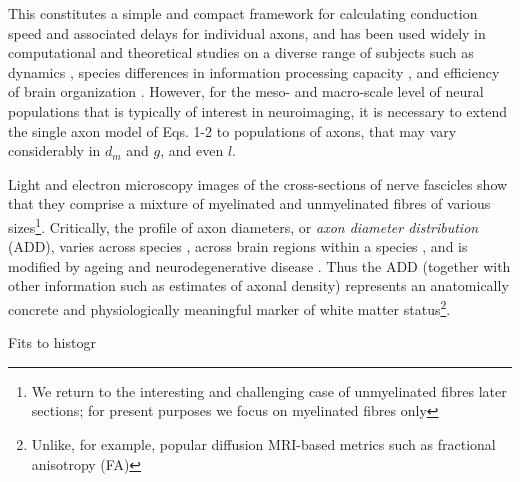 

This constitutes a simple and compact framework for calculating conduction speed and associated delays for individual axons, and has been used widely in computational and theoretical studies on a diverse range of subjects such as dynamics \cite{bojak2010axonal}, species differences in information processing capacity \cite{caminiti2009evolution}, and efficiency of brain organization \cite{chomiak2009what}. However, for the meso- and macro-scale level of neural populations that is typically of interest in neuroimaging, it is necessary to extend the single axon model of Eqs. 1-2 to  populations of axons, that may vary considerably in $d_m$ and $g$, and even $l$. 

Light and electron microscopy images of the cross-sections of nerve fascicles show that they comprise a mixture of myelinated and unmyelinated fibres of various sizes\footnote{We return to the interesting and challenging case of unmyelinated fibres later sections; for present purposes we focus on myelinated fibres only}. Critically, the profile of axon diameters, or \textit{axon diameter distribution} (ADD), varies across species \cite{caminiti2013diameter}, across brain regions within a species \cite{aboitiz1992fiber,innocenti2010fiber}, and is modified by ageing and neurodegenerative disease \cite{peters2009the}. Thus the ADD (together with other information such as estimates of axonal density) represents an anatomically concrete and physiologically meaningful marker of white matter status\footnote{Unlike, for example, popular diffusion MRI-based metrics such as fractional anisotropy (FA)}. 

Fits to histogr